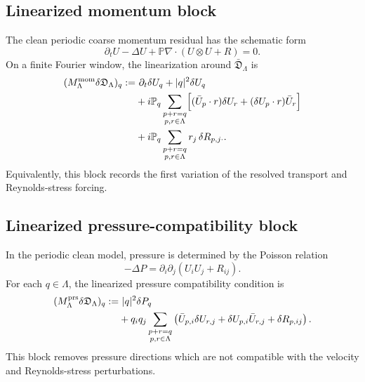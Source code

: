 \documentclass[11pt]{article}
\numberwithin{equation}{section}
\begin{document}
\subsection{Linearized momentum block}

The clean periodic coarse momentum residual has the schematic form
\[
        \partial_t U
        -
        \Delta U
        +
        \mathbb P\nabla\cdot (U\otimes U+R)
        =
        0.
\]
On a finite Fourier window, the linearization around
\(\bar{\mathfrak D}_\Lambda\) is
\[
\begin{aligned}
        (M_\Lambda^{\rm mom}\delta\mathfrak D_\Lambda)_q
        :=
        &\ \partial_t \delta U_q
        + |q|^2\delta U_q                                      \\
        &+
        i\mathbb P_q
        \sum_{\substack{p+r=q\\p,r\in\Lambda}}
        \Bigl[
        (\bar U_p\cdot r)\delta U_r
        +
        (\delta U_p\cdot r)\bar U_r
        \Bigr]                                                   \\
        &+
        i\mathbb P_q
        \sum_{\substack{p+r=q\\p,r\in\Lambda}}
        r_j\,\delta R_{p,j\cdot}.
\end{aligned}
\]
Equivalently, this block records the first variation of the resolved
transport and Reynolds-stress forcing.

\subsection{Linearized pressure-compatibility block}

In the periodic clean model, pressure is determined by the Poisson relation
\[
        -\Delta P
        =
        \partial_i\partial_j(U_iU_j+R_{ij}).
\]
For each \(q\in\Lambda\), the linearized pressure compatibility condition is
\[
\begin{aligned}
        (M_\Lambda^{\rm prs}\delta\mathfrak D_\Lambda)_q
        :=
        &\ |q|^2\delta P_q                                      \\
        &+
        q_iq_j
        \sum_{\substack{p+r=q\\p,r\in\Lambda}}
        \left(
        \bar U_{p,i}\delta U_{r,j}
        +
        \delta U_{p,i}\bar U_{r,j}
        +
        \delta R_{p,ij}
        \right).
\end{aligned}
\]
This block removes pressure directions which are not compatible with the
velocity and Reynolds-stress perturbations.
\end{document}
